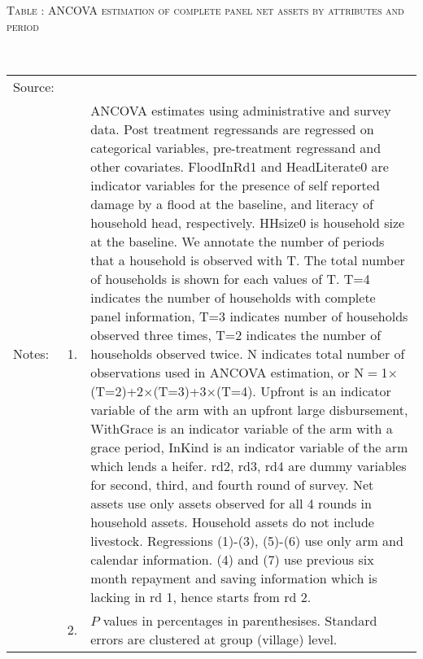 \hspace{-1cm}\begin{minipage}[t]{14cm}
\hfil\textsc{\normalsize Table \thetable: ANCOVA estimation of complete panel net assets by attributes and period\label{tab ANCOVA narrow complete panel net assets timevarying attributes}}\\
\setlength{\tabcolsep}{1pt}
\setlength{\baselineskip}{8pt}
\renewcommand{\arraystretch}{.55}
\hfil{}\\
\renewcommand{\arraystretch}{.8}
\setlength{\tabcolsep}{1pt}
\begin{tabular}{>{\hfill\scriptsize}p{1cm}<{}>{\hfill\scriptsize}p{.25cm}<{}>{\scriptsize}p{12cm}<{\hfill}}
Source:& \multicolumn{2}{l}{\scriptsize Estimated with GUK administrative and survey data.}\\
Notes: & 1. & ANCOVA estimates using administrative and survey data. Post treatment regressands are regressed on categorical variables, pre-treatment regressand and other covariates. \textsf{FloodInRd1} and \textsf{HeadLiterate0} are indicator variables for the presence of self reported damage by a flood at the baseline, and literacy of household head, respectively. \textsf{HHsize0} is household size at the baseline. We annotate the number of periods that a household is observed with \textsf{T}. The total number of households is shown for each values of \textsf{T}. \textsf{T=4} indicates the number of households with complete panel information, \textsf{T=3} indicates number of households observed three times, \textsf{T=2} indicates the number of households observed twice. \textsf{N} indicates total number of observations used in ANCOVA estimation, or \textsf{N$=$1$\times$(T=2)+2$\times$(T=3)+3$\times$(T=4)}.  \textsf{Upfront} is an indicator variable of the arm with an upfront large disbursement, \textsf{WithGrace} is an indicator variable of the arm with a grace period, \textsf{InKind} is an indicator variable of the arm which lends a heifer. \textsf{rd2, rd3, rd4} are dummy variables for second, third, and fourth round of survey. Net assets use only assets observed for all 4 rounds in household assets. Household assets do not include livestock. Regressions (1)-(3), (5)-(6) use only arm and calendar information. (4) and (7) use previous six month repayment and saving information which is lacking in rd 1, hence starts from rd 2.\\
& 2. & $P$ values in percentages in parenthesises. Standard errors are clustered at group (village) level.
\end{tabular}
\end{minipage}


